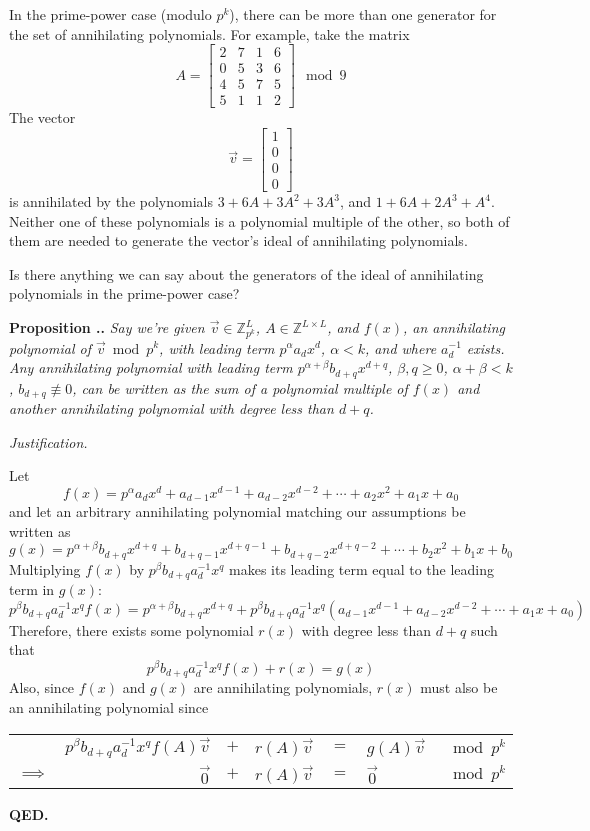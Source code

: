 \documentclass[a4paper, reqno, 12pt]{amsart}
\newcounter{propcounter}[section]
\newenvironment{proposition}[1]
{
	\refstepcounter{propcounter}
	\textbf{Proposition \thesection.\thepropcounter.} \emph{#1}
	
	\emph{Justification.}
}
{
	\textbf{QED.} \\
}
\begin{document}
		In the prime-power case (modulo $p^k$), there can be more than one generator for the set of annihilating polynomials. For example, take the matrix
		\[
			A = \begin{bmatrix}
				2 & 7 & 1 & 6 \\
				0 & 5 & 3 & 6 \\
				4 & 5 & 7 & 5 \\
				5 & 1 & 1 & 2
			\end{bmatrix} \mod{9}
		\]
		The vector 
		\[
			\vec{v} = \begin{bmatrix}
				1 \\
				0 \\
				0 \\
				0
			\end{bmatrix}
		\]
		is annihilated by the polynomials $3 + 6A + 3A^2 + 3A^3$, and $1 + 6A + 2A^3 + A^4$. Neither one of these polynomials is a polynomial multiple of the other, so 
		both of them are needed to generate the vector's ideal of annihilating polynomials.
		
		Is there anything we can say about the generators of the ideal of annihilating polynomials in the prime-power case?
		
		\begin{proposition}{Say we're given $\vec{v} \in \mathds{Z}_{p^k}^{L}$, $A \in \mathds{Z}^{L \times L}$, and $f(x)$, an annihilating polynomial of 
		$\vec{v} \bmod{p^k}$, with leading term $p^{\alpha}a_dx^d$, $\alpha < k$, and where $a_d^{-1}$ exists. Any annihilating polynomial with leading term 
		$p^{\alpha+\beta}b_{d+q}x^{d+q}$, $\beta, q \geq 0$, $\alpha+\beta < k$, $b_{d+q} \not\equiv 0$, can be written as the sum of a polynomial multiple of 
		$f(x)$ and another annihilating polynomial with degree less than $d+q$.}
			\label{prop:splitBiggerPoly}
			Let 
			\[
				f(x) = p^{\alpha}a_dx^d + a_{d-1}x^{d-1} + a_{d-2}x^{d-2} + \cdots + a_2x^2 + a_1x + a_0
			\]
			and let an arbitrary annihilating polynomial matching our assumptions be written as
			\[
				g(x) = p^{\alpha+\beta}b_{d+q}x^{d+q} + b_{d+q-1}x^{d+q-1} + b_{d+q-2}x^{d+q-2} + \cdots + b_2x^2 + b_1x + b_0
			\]
			Multiplying $f(x)$ by $p^{\beta}b_{d+q}a_d^{-1}x^q$ makes its leading term equal to the leading term in $g(x)$:
			\[
				p^{\beta}b_{d+q}a_d^{-1}x^qf(x) = p^{\alpha+\beta}b_{d+q}x^{d+q} + p^{\beta}b_{d+q}a_d^{-1}x^q(a_{d-1}x^{d-1} + a_{d-2}x^{d-2} + \cdots + a_1x + a_0)
			\]
			Therefore, there exists some polynomial $r(x)$ with degree less than $d+q$ such that
			\[
				p^{\beta}b_{d+q}a_d^{-1}x^qf(x) + r(x) = g(x)
			\]
			Also, since $f(x)$ and $g(x)$ are annihilating polynomials, $r(x)$ must also be an annihilating polynomial since
			\begin{center}
				\begin{tabular}{crclclc}
							   & $p^{\beta}b_{d+q}a_d^{-1}x^qf(A)\vec{v}$ & $+$ & $r(A)\vec{v}$ & $=$ & $g(A)\vec{v}$ & $\mod{p^k}$ \\
					$\implies$ &                                $\vec{0}$ & $+$ & $r(A)\vec{v}$ & $=$ & $\vec{0}$     & $\mod{p^k}$
				\end{tabular}
			\end{center}
		\end{proposition}
		
\end{document}
